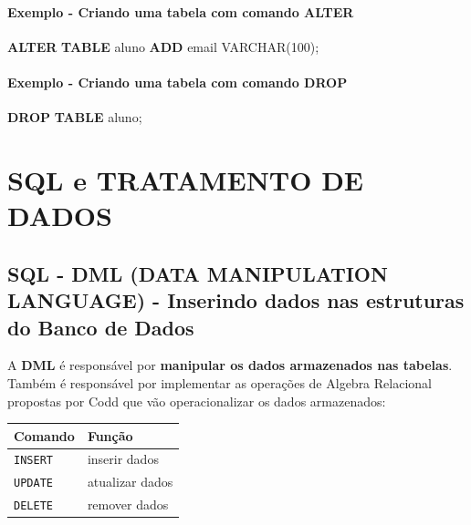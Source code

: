 \documentclass[
]{book}
\newenvironment{Shaded}{\begin{snugshade}}{\end{snugshade}}
\newcommand{\DataTypeTok}[1]{\textcolor[rgb]{0.13,0.29,0.53}{#1}}
\newcommand{\DecValTok}[1]{\textcolor[rgb]{0.00,0.00,0.81}{#1}}
\newcommand{\KeywordTok}[1]{\textcolor[rgb]{0.13,0.29,0.53}{\textbf{#1}}}
\newcommand{\NormalTok}[1]{#1}
\begin{document}
\paragraph{Exemplo - Criando uma tabela com comando ALTER}\label{exemplo---criando-uma-tabela-com-comando-alter}

\begin{Shaded}
\begin{Highlighting}[]
\KeywordTok{ALTER} \KeywordTok{TABLE}\NormalTok{ aluno}
\KeywordTok{ADD}\NormalTok{ email }\DataTypeTok{VARCHAR}\NormalTok{(}\DecValTok{100}\NormalTok{);}
\end{Highlighting}
\end{Shaded}

\paragraph{Exemplo - Criando uma tabela com comando DROP}\label{exemplo---criando-uma-tabela-com-comando-drop}

\begin{Shaded}
\begin{Highlighting}[]
\KeywordTok{DROP} \KeywordTok{TABLE}\NormalTok{ aluno;}
\end{Highlighting}
\end{Shaded}

\section{SQL e TRATAMENTO DE DADOS}\label{sql-e-tratamento-de-dados}

\subsection{SQL - DML (DATA MANIPULATION LANGUAGE) - Inserindo dados nas estruturas do Banco de Dados}\label{sql---dml-data-manipulation-language---inserindo-dados-nas-estruturas-do-banco-de-dados}

A \textbf{DML} é responsável por \textbf{manipular os dados armazenados nas tabelas}. Também é responsável por implementar as operações de Algebra Relacional propostas por Codd que vão operacionalizar os dados armazenados:

\begin{longtable}[]{@{}ll@{}}
\toprule\noalign{}
Comando & Função \\
\midrule\noalign{}
\endhead
\bottomrule\noalign{}
\endlastfoot
\texttt{INSERT} & inserir dados \\
\texttt{UPDATE} & atualizar dados \\
\texttt{DELETE} & remover dados \\
\end{longtable}
\end{document}
